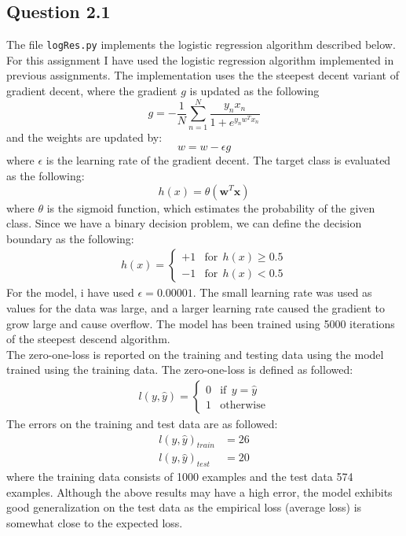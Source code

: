 \documentclass{article}
\begin{document}
\subsection{Question 2.1}
The file \texttt{logRes.py} implements the logistic regression algorithm described below.
\\
For this assignment I have used the logistic regression algorithm implemented in previous assignments. The implementation uses the the steepest decent variant of gradient decent, where the gradient $g$ is updated as the following
\begin{equation}
g = - \dfrac{1}{N} \sum\limits_{n=1}^N \dfrac{y_nx_n}{1+e^{y_nw^Tx_n}}
\end{equation}
and the weights are updated by: 
\begin{equation}
w = w - \epsilon g
\end{equation}
where $\epsilon$ is the learning rate of the gradient decent. The target class is evaluated as the following:
\begin{equation*}
h(x) = \theta(\mathbf{w}^T\mathbf{x})
\end{equation*}
where $\theta$ is the sigmoid function, which estimates the probability of the given class. Since we have a binary decision problem, we can define the decision boundary as the following: 
\begin{align*}
h(x) =
\begin{cases} 
      +1 & \text{for} \;\, h(x) \geq 0.5 \\
      -1 & \text{for} \;\, h(x) < 0.5
   \end{cases}
\end{align*}
For the model, i have used $\epsilon = 0.00001$. The small learning rate was used as values for the data was large, and a larger learning rate caused the gradient to grow large and cause overflow. The model has been trained using 5000 iterations of the steepest descend algorithm. \\
The zero-one-loss is reported on the training and testing data using the model trained using the training data. The zero-one-loss is defined as followed:
\begin{align*}
l(y,\hat{y}) =
\begin{cases} 
      0 & \text{if} \;\, y = \hat{y} \\
      1 & \text{otherwise}
   \end{cases}
\end{align*}
The errors on the training and test data are as followed:
\begin{align*}
l(y,\hat{y})_{train} &= 26\\
l(y,\hat{y})_{test} &= 20
\end{align*}
where the training data consists of 1000 examples and the test data 574 examples. Although the above results may have a high error, the model exhibits good generalization on the test data as the empirical loss (average loss) is somewhat close to the expected loss.
\end{document}
